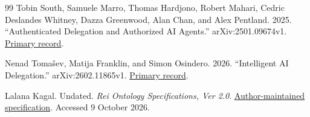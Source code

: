 \documentclass[
  english,
  12pt,
  a4paper,
  preprint,
  numbers,
  nopreprintline]{elsarticle}
\begin{document}
\begin{thebibliography}{99}
Tobin South, Samuele Marro, Thomas Hardjono, Robert Mahari, Cedric
Deslandes Whitney, Dazza Greenwood, Alan Chan, and Alex Pentland. 2025.
``Authenticated Delegation and Authorized AI Agents.''
arXiv:2501.09674v1. \href{https://arxiv.org/abs/2501.09674v1}{Primary
record}.

Nenad Tomašev, Matija Franklin, and Simon Osindero. 2026. ``Intelligent
AI Delegation.'' arXiv:2602.11865v1.
\href{https://arxiv.org/abs/2602.11865v1}{Primary record}.

Lalana Kagal. Undated. \emph{Rei Ontology Specifications, Ver 2.0}.
\href{https://userpages.cs.umbc.edu/lkagal1/rei/}{Author-maintained
specification}. Accessed 9 October 2026.
\end{thebibliography}
\end{document}
